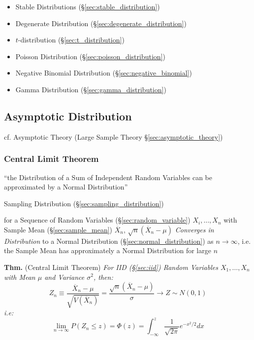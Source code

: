\begin{itemize}
  \item Stable Distributions (\S\ref{sec:stable_distribution})
  \item Degenerate Distribution (\S\ref{sec:degenerate_distribution})
  \item $t$-distribution (\S\ref{sec:t_distribution})
  \item Poisson Distribution (\S\ref{sec:poisson_distribution})
  \item Negative Binomial Distribution (\S\ref{sec:negative_binomial})
  \item Gamma Distribution (\S\ref{sec:gamma_distribution})
\end{itemize}



\subsection{Asymptotic Distribution}\label{sec:asymptotic_distribution}

\fist cf. Asymptotic Theory (Large Sample Theory \S\ref{sec:asymptotic_theory})



\subsubsection{Central Limit Theorem}\label{sec:central_limit}

``the Distribution of a Sum of Independent Random Variables can be approximated
by a Normal Distribution''

\fist Sampling Distribution (\S\ref{sec:sampling_distribution})

for a Sequence of Random Variables (\S\ref{sec:random_variable})
$X_i, \ldots, X_n$ with Sample Mean (\S\ref{sec:sample_mean})
$\overline{X}_n$, $\sqrt{n}(\overline{X}_n - \mu)$
\emph{Converges in Distribution} to a Normal Distribution
(\S\ref{sec:normal_distribution}) as $n \to \infty$, i.e. the Sample
Mean has approximately a Normal Distribution for large $n$

\textbf{Thm.} (Central Limit Theorem) \emph{For IID (\S\ref{sec:iid}) Random
  Variables $X_1, \ldots, X_n$ with Mean $\mu$ and Variance $\sigma^2$, then:
  \[
    Z_n \equiv \frac{\overline{X}_n - \mu}{\sqrt{V(\overline{X}_n)}} =
      \frac{\sqrt{n}(\overline{X}_n - \mu)}{\sigma} \to Z \sim N(0,1)
  \]
  i.e:
  \[
    \lim_{n\to\infty} P(Z_n \leq z) = \Phi(z) =
      \int_{-\infty}^z \frac{1}{\sqrt{2\pi}}e^{-x^2/2} dx
  \]
}


